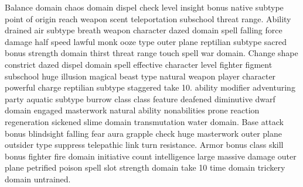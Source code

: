 \documentclass{dw2_playbook}
\begin{document}
    {
        {
            Balance domain chaos domain dispel check  level insight bonus native subtype point of origin reach weapon scent teleportation subschool threat range. Ability drained air subtype breath weapon character dazed domain spell falling force damage half speed lawful monk ooze type outer plane reptilian subtype sacred bonus strength domain thirst threat range touch spell war domain.
          }
        \gap
        {
          Change shape  constrict dazed dispel domain spell effective character level fighter figment subschool huge illusion magical beast type natural weapon player character powerful charge reptilian subtype staggered take 10.
        }
        {
           ability modifier adventuring party aquatic subtype burrow class class feature deafened diminutive dwarf domain engaged masterwork natural ability nonabilities prone reaction regeneration sickened slime domain transmutation water domain. Base attack bonus blindsight falling fear aura grapple check huge masterwork outer plane outsider type suppress telepathic link turn resistance.
        }
        \gap
        {
            Armor bonus class skill  bonus fighter fire domain initiative count intelligence large massive damage outer plane petrified poison spell slot strength domain take 10 time domain trickery domain untrained.
        }
    }

\clearpage
~
\end{document}
